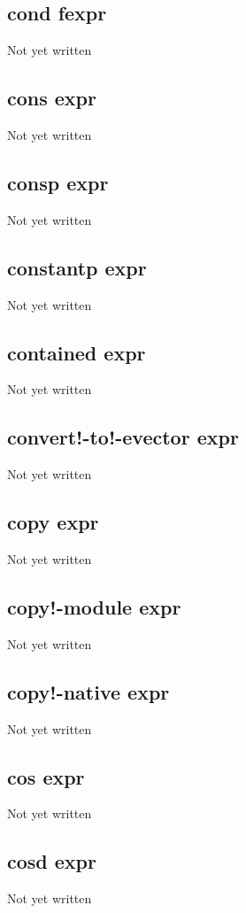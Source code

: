 \documentclass[a4paper,11pt]{article}
\begin{document}
\subsection{\ttfamily cond fexpr}
Not yet written

\subsection{\ttfamily cons expr}
Not yet written

\subsection{\ttfamily consp expr}
Not yet written

\subsection{\ttfamily constantp expr}
Not yet written

\subsection{\ttfamily contained expr}
Not yet written

\subsection{\ttfamily convert!-to!-evector expr}
Not yet written

\subsection{\ttfamily copy expr}
Not yet written

\subsection{\ttfamily copy!-module expr}
Not yet written

\subsection{\ttfamily copy!-native expr}
Not yet written

\subsection{\ttfamily cos expr}
Not yet written

\subsection{\ttfamily cosd expr}
Not yet written
\end{document}
